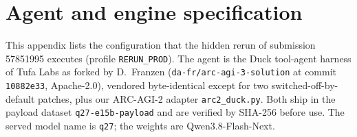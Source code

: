 \section{Agent and engine specification}\label{app:spec}

This appendix lists the configuration that the hidden rerun of submission 57851995 executes (profile \texttt{RERUN\_PROD}). The agent is the Duck tool-agent harness of Tufa Labs as forked by D.~Franzen (\texttt{da-fr/arc-agi-3-solution} at commit \texttt{10882e33}, Apache-2.0), vendored byte-identical except for two switched-off-by-default patches, plus our ARC-AGI-2 adapter \texttt{arc2\_duck.py}. Both ship in the payload dataset \texttt{q27-e15b-payload} and are verified by SHA-256 before use. The served model name is \texttt{q27}; the weights are Qwen3.8-Flash-Next.


